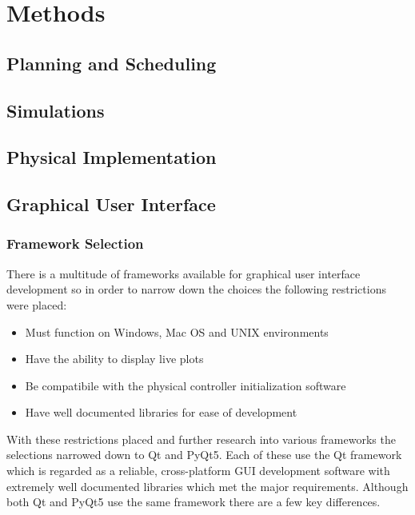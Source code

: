 
\section{Methods}

\subsection{Planning and Scheduling}



\subsection{Simulations}




\subsection{Physical Implementation}




\subsection{Graphical User Interface}
\subsubsection{Framework Selection}

There is a multitude of frameworks available for graphical user interface development so in order to narrow down the choices the following restrictions were placed: 
\begin{itemize}
	\item Must function on Windows, Mac OS and UNIX environments
	\item Have the ability to display live plots
	\item Be compatibile with the physical controller initialization software
	\item Have well documented libraries for ease of development 
\end{itemize}
With these restrictions placed and further research into various frameworks the selections narrowed down to Qt and PyQt5. Each of these use the Qt framework which is regarded as a reliable, cross-platform GUI development software with extremely well documented libraries which met the major requirements. Although both Qt and PyQt5 use the same framework there are a few key differences. 

